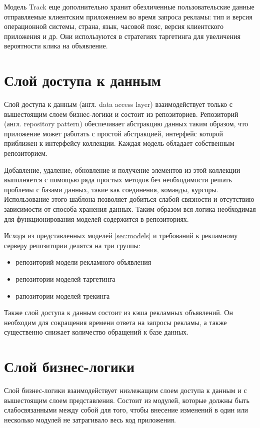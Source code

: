 \documentclass[times]{itmo-student-thesis}
\begin{document}
Модель Track еще дополнительно хранит обезличенные пользовательские данные отправляемые клиентским приложением во время запроса рекламы: тип и версия операционной системы, страна, язык, часовой пояс, версия клиентского приложения и др. Они используются в стратегиях таргетинга для увеличения вероятности клика на объявление.



\section{Слой доступа к данным}\label{sec:data-access-layer}

Слой доступа к данным (англ. data access layer) \cite{data-access-layer} взаимодействует только с вышестоящим слоем бизнес-логики и состоит из репозиториев. Репозиторий (англ. repository pattern) \cite{repository-pattern} обеспечивает абстракцию данных таким образом, что приложение может работать с простой абстракцией, интерфейс которой приближен к интерфейсу коллекции. Каждая модель обладает собственным репозиторием.

Добавление, удаление, обновление и получение элементов из этой коллекции выполняется с помощью ряда простых методов без необходимости решать проблемы с базами данных, такие как соединения, команды, курсоры. Использование этого шаблона позволяет добиться слабой связности и отсутствию зависимости от способа хранения данных. Таким образом вся логика необходимая для функционирования моделей содержится в репозиториях.

Исходя из представленных моделей \ref{sec:models} и требований к рекламному серверу репозитории делятся на три группы:
\begin{itemize}
\item репозиторий модели рекламного объявления
\item репозитории моделей таргетинга
\item рапозитории моделей трекинга
\end{itemize}

Также слой доступа к данным состоит из кэша рекламных объявлений. Он необходим для сокращения времени ответа на запросы рекламы, а также существенно снижает количество обращений к базе данных.

\section{Слой бизнес-логики}\label{sec:business-logic-layer}

Слой бизнес-логики взаимодействует низлежащим слоем доступа к данным и с вышестоящим слоем представления. Состоит из модулей, которые должны быть слабосвязанными между собой для того, чтобы внесение изменений в один или несколько модулей не затрагивало весь код приложения.
\end{document}
